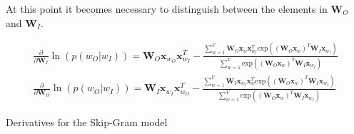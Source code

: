 At this point it becomes necessary to distinguish between the elements in $\mathbf{W}_O$ and $\mathbf{W}_I$.

\begin{equationbox}[H]
\begin{equation*}
\begin{aligned}
\frac{\partial}{\partial \mathbf{W}_I} \ln( p(w_O | w_I) ) = \mathbf{W}_O \mathbf{x}_{w_O} \mathbf{x}_{w_I}^T - \frac{
	\sum_{w=1}^V \mathbf{W}_O \mathbf{x}_{w} \mathbf{x}_{w_I}^T \mathrm{exp}( \left( \mathbf{W}_O \mathbf{x}_{w} \right)^T \mathbf{W}_I \mathbf{x}_{w_I})
} {
	\sum_{w=1}^V \mathrm{exp}( \left( \mathbf{W}_O \mathbf{x}_{w} \right)^T \mathbf{W}_I \mathbf{x}_{w_I})
} \\
\frac{\partial}{\partial \mathbf{W}_O} \ln( p(w_O | w_I) ) = \mathbf{W}_I \mathbf{x}_{w_I} \mathbf{x}_{w_O}^T - \frac{
	\sum_{w=1}^V \mathbf{W}_I \mathbf{x}_{w_I} \mathbf{x}_{w}^T \mathrm{exp}( \left( \mathbf{W}_O \mathbf{x}_{w} \right)^T \mathbf{W}_I \mathbf{x}_{w_I})
} {
	\sum_{w=1}^V \mathrm{exp}( \left( \mathbf{W}_O \mathbf{x}_{w} \right)^T \mathbf{W}_I \mathbf{x}_{w_I})
}
\end{aligned}
\end{equation*}
\caption{Derivatives for the Skip-Gram model}
\end{equationbox}

